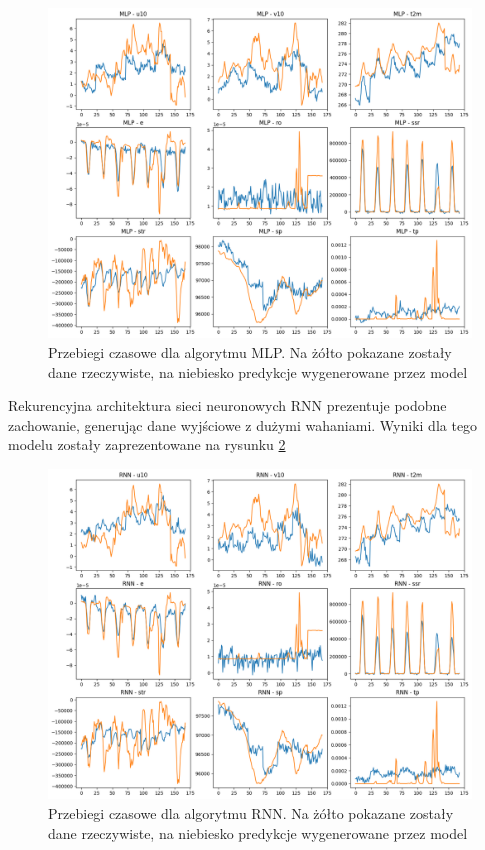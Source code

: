 \begin{figure}[H]
    \centering
    \includegraphics[width=\textwidth]{images/MLP_week.png}
    \caption{Przebiegi czasowe dla algorytmu MLP. Na żółto pokazane zostały dane 
    rzeczywiste, na niebiesko predykcje wygenerowane przez model}
    \label{mlp-week}
\end{figure}

Rekurencyjna architektura sieci neuronowych RNN prezentuje podobne zachowanie, 
generując dane wyjściowe z dużymi wahaniami. Wyniki dla tego modelu zostały zaprezentowane na rysunku \ref{rnn-week}

\begin{figure}[H]
    \centering
    \includegraphics[width=\textwidth]{images/rnn_week.png}
    \caption{Przebiegi czasowe dla algorytmu RNN. Na żółto pokazane zostały dane 
    rzeczywiste, na niebiesko predykcje wygenerowane przez model}
    \label{rnn-week}
\end{figure}

